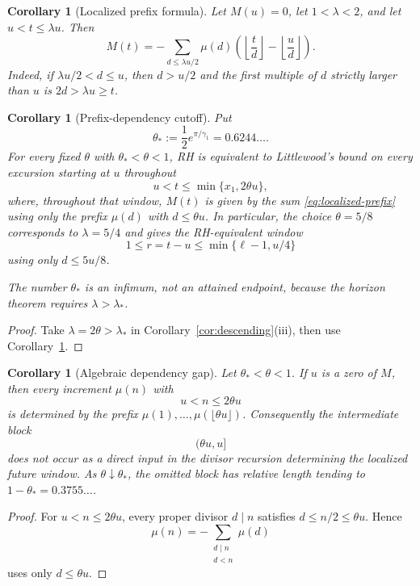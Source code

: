 \documentclass[11pt]{amsart}
\numberwithin{equation}{section}
\theoremstyle{plain}
\newtheorem{corollary}[theorem]{Corollary}
\theoremstyle{definition}
\theoremstyle{remark}
\begin{document}
\begin{corollary}[Localized prefix formula]
\label{cor:localized-prefix}
Let $M(u)=0$, let $1<\lambda<2$, and let $u<t\le\lambda u$.  Then
\begin{equation}
\label{eq:localized-prefix}
M(t)=-\sum_{d\le\lambda u/2}\mu(d)
\left(\left\lfloor\frac td\right\rfloor-
\left\lfloor\frac ud\right\rfloor\right).
\end{equation}
Indeed, if $\lambda u/2<d\le u$, then $d>u/2$ and the first multiple of
$d$ strictly larger than $u$ is $2d>\lambda u\ge t$.
\end{corollary}

\begin{corollary}[Prefix-dependency cutoff]
\label{cor:prefix-cutoff}
Put
\[
\theta_*:=\frac12e^{\pi/\gamma_1}=0.6244\ldots .
\]
For every fixed $\theta$ with $\theta_*<\theta<1$, RH is equivalent to
Littlewood's bound on every excursion starting at $u$ throughout
\[
u<t\le\min\{x_1,2\theta u\},
\]
where, throughout that window, $M(t)$ is given by the sum
\eqref{eq:localized-prefix} using only the prefix
$\mu(d)$ with $d\le\theta u$.  In particular, the choice
$\theta=5/8$ corresponds to $\lambda=5/4$ and gives the RH-equivalent
window
\[
1\le r=t-u\le\min\{\ell-1,u/4\}
\]
using only $d\le5u/8$.

The number $\theta_*$ is an infimum, not an attained endpoint, because the
horizon theorem requires $\lambda>\lambda_*$.
\end{corollary}

\begin{proof}
Take $\lambda=2\theta>\lambda_*$ in
Corollary~\ref{cor:descending}(iii), then use
Corollary~\ref{cor:localized-prefix}.
\end{proof}


\begin{corollary}[Algebraic dependency gap]
\label{cor:dependency-gap}
Let $\theta_*<\theta<1$.  If $u$ is a zero of $M$, then every increment
$\mu(n)$ with
\[
u<n\le2\theta u
\]
is determined by the prefix
$\mu(1),\ldots,\mu(\lfloor\theta u\rfloor)$.  Consequently the intermediate
block
\[
(\theta u,u]
\]
does not occur as a direct input in the divisor recursion determining the
localized future window.  As $\theta\downarrow\theta_*$, the omitted block
has relative length tending to
$1-\theta_*=0.3755\ldots$.
\end{corollary}

\begin{proof}
For $u<n\le2\theta u$, every proper divisor $d\mid n$ satisfies
$d\le n/2\le\theta u$.  Hence
\[
\mu(n)=-\sum_{\substack{d\mid n\\ d<n}}\mu(d)
\]
uses only $d\le\theta u$.
\end{proof}
\end{document}

